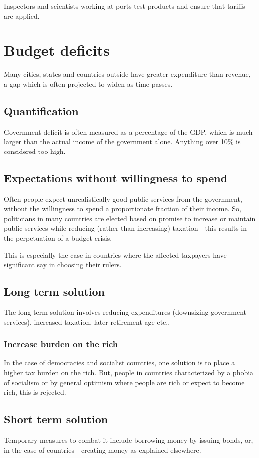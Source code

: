 \documentclass[oneside, article]{memoir}
\begin{document}
Inspectors and scientists working at ports test products and ensure that tariffs are applied.

\section{Budget deficits}
Many cities, states and countries outside have greater expenditure than revenue, a gap which is often projected to widen as time passes.

\subsection{Quantification}
Government deficit is often measured as a percentage of the GDP, which is much larger than the actual income of the government alone. Anything over 10\% is considered too high.

\subsection{Expectations without willingness to spend}
Often people expect unrealistically good public services from the government, without the willingness to spend a proportionate fraction of their income. So, politicians in many countries are elected based on promise to increase or maintain public services while reducing (rather than increasing) taxation - this results in the perpetuation of a budget crisis. 

This is especially the case in countries where the affected taxpayers have significant say in choosing their rulers.

\subsection{Long term solution}
The long term solution involves reducing expenditures (downsizing government services), increased taxation, later retirement age etc..

\subsubsection{Increase burden on the rich}
In the case of democracies and socialist countries, one solution is to place a higher tax burden on the rich. But, people in countries characterized by a phobia of socialism or by general optimism where people are rich or expect to become rich, this is rejected.

\subsection{Short term solution}
Temporary measures to combat it include borrowing money by issuing bonds, or, in the case of countries - creating money as explained elsewhere.
\end{document}
